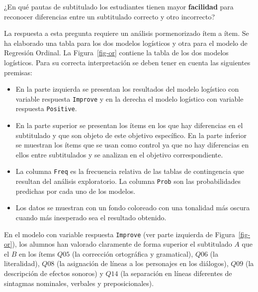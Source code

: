 \documentclass[
  12pt,
  a4paper,
  extrafontsizes,
  onecolumn,
  openright,
  table]{memoir}
\providecommand{\tightlist}{%
  \setlength{\itemsep}{0pt}\setlength{\parskip}{0pt}}\usepackage{longtable,booktabs,array}
\begin{document}
\begin{tcolorbox}[enhanced jigsaw, arc=.35mm, bottomrule=.15mm, left=2mm, colframe=quarto-callout-tip-color-frame, coltitle=black, colback=white, rightrule=.15mm, opacityback=0, breakable, leftrule=.75mm, colbacktitle=quarto-callout-tip-color!10!white, opacitybacktitle=0.6, bottomtitle=1mm, toptitle=1mm, titlerule=0mm, title=\textcolor{quarto-callout-tip-color}{\faLightbulb}\hspace{0.5em}{Objetivo específico}, toprule=.15mm]

¿En qué pautas de subtitulado los estudiantes tienen mayor
\textbf{facilidad} para reconocer diferencias entre un subtitulado
correcto y otro incorrecto?

\end{tcolorbox}

La respuesta a esta pregunta requiere un análisis pormenorizado ítem a
ítem. Se ha elaborado una tabla para los dos modelos logísticos y otra
para el modelo de Regresión Ordinal. La Figura~\ref{fig-or} contiene la
tabla de los dos modelos logísticos. Para su correcta interpretación se
deben tener en cuenta las siguientes premisas:

\begin{itemize}
\tightlist
\item
  En la parte izquierda se presentan los resultados del modelo logístico
  con variable respuesta \texttt{Improve} y en la derecha el modelo
  logístico con variable respuesta \texttt{Positive}.
\item
  En la parte superior se presentan los ítems en los que hay diferencias
  en el subtitulado y que son objeto de este objetivo específico. En la
  parte inferior se muestran los ítems que se usan como control ya que
  no hay diferencias en ellos entre subtitulados y se analizan en el
  objetivo correspondiente.
\item
  La columna \texttt{Freq} es la frecuencia relativa de las tablas de
  contingencia que resultan del análisis exploratorio. La columna
  \texttt{Prob} son las probabilidades predichas por cada uno de los
  modelos.
\item
  Los datos se muestran con un fondo coloreado con una tonalidad más
  oscura cuando más inesperado sea el resultado obtenido.
\end{itemize}

En el modelo con variable respuesta \texttt{Improve} (ver parte
izquierda de Figura~\ref{fig-or}), los alumnos han valorado claramente
de forma superior el subtitulado \(A\) que el \(B\) en los ítems \(Q05\)
(la corrección ortográfica y gramatical), \(Q06\) (la literalidad),
\(Q08\) (la asignación de líneas a los personajes en los diálogos),
\(Q09\) (la descripción de efectos sonoros) y \(Q14\) (la separación en
líneas diferentes de sintagmas nominales, verbales y preposicionales).
\end{document}
